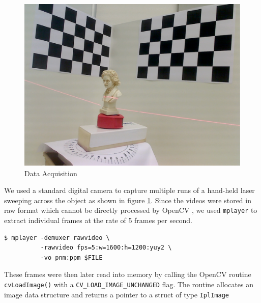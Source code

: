 \begin{figure}[ht!]
\centering
\includegraphics[width=0.5\linewidth]{figures/introduction}
\caption{Data Acquisition}
\label{figure:acquisition}
\end{figure}

We used a standard digital camera to capture multiple runs of a hand-held laser sweeping across the object as shown in figure \ref{figure:acquisition}. Since the videos were stored in raw format which cannot be directly processed by OpenCV \cite{bradski:2008}, we used \texttt{mplayer} to extract individual frames at the rate of 5 frames per second.

\begin{verbatim}
$ mplayer -demuxer rawvideo \
          -rawvideo fps=5:w=1600:h=1200:yuy2 \
          -vo pnm:ppm $FILE	
\end{verbatim}

These frames were then later read into memory by calling the OpenCV routine \texttt{cvLoadImage()} with a \texttt{CV\_LOAD\_IMAGE\_UNCHANGED} flag. The routine allocates an image data structure and returns a pointer to a struct of type \texttt{IplImage}